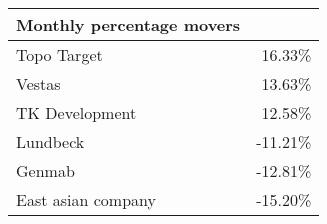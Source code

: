 \begin{tabular}{lr}

\toprule

Monthly percentage movers\\
\midrule

Topo Target & 16.33\%\\
Vestas & 13.63\%\\
TK Development & 12.58\%\\
\midrule

Lundbeck & -11.21\%\\
Genmab & -12.81\%\\
East asian company & -15.20\%\\
\bottomrule

\end{tabular}